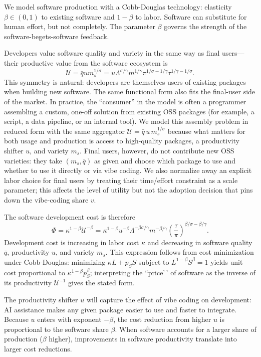 \documentclass[11pt,a4paper]{article}
\theoremstyle{definition}
\theoremstyle{remark}
\begin{document}
We model software production with a Cobb-Douglas technology: elasticity
\(\beta \in (0,1)\) to existing software and \(1-\beta\) to labor.
Software can substitute for human effort, but not completely. The parameter \(\beta\)
governs the strength of the software-begets-software feedback.

Developers value
software quality and variety in the same way as final users---their
productive value from the software ecosystem is \[
\mathcal U = \bar q u m_s^{1/\sigma} = u\Lambda^{\sigma/\gamma}m^{1/\gamma}{\pi^{1/\sigma-1/\gamma}}{\tau^{1/\gamma-1/\sigma}}.
\] This symmetry is natural: developers are themselves users of existing
packages when building new software. The same functional form also fits the final-user side of the market. In practice, the ``consumer'' in the model is often a programmer assembling a custom, one-off solution from existing OSS packages (for example, a script, a data pipeline, or an internal tool). We model this assembly problem in reduced form with the same aggregator $\mathcal U = \bar q\,u\,m_s^{1/\sigma}$ because what matters for both usage and production is access to high-quality packages, a productivity shifter $u$, and variety $m_s$. Final users, however, do not contribute new OSS varieties: they take $(m_s,\bar q)$ as given and choose which package to use and whether to use it directly or via vibe coding. We also normalize away an explicit labor choice for final users by treating their time/effort constraint as a scale parameter; this affects the level of utility but not the adoption decision that pins down the vibe-coding share $v$.

The software development cost is
therefore \[
\Phi = \kappa^{1-\beta}\mathcal U^{-\beta} = 
\kappa^{1-\beta}
u^{-\beta}\Lambda^{-\beta\sigma/\gamma}m^{-\beta/\gamma}
\left(\frac\tau{\pi}\right)^{\beta/\sigma-\beta/\gamma}.
\] Development cost is increasing in labor cost \(\kappa\) and
decreasing in software quality \(\bar q\), productivity \(u\), and
variety \(m_s\). This expression follows from cost minimization under
Cobb-Douglas: minimizing \(\kappa L + p_S S\) subject to
\(L^{1-\beta}S^\beta = 1\) yields unit cost proportional to
\(\kappa^{1-\beta}p_S^\beta\); interpreting the ``price'\,' of software
as the inverse of its productivity \(\mathcal{U}^{-1}\) gives the stated
form.

The productivity shifter \(u\) will capture the effect of vibe coding on
development: AI assistance makes any given package easier to use and
faster to integrate. Because \(u\) enters with exponent \(-\beta\), the
cost reduction from higher \(u\) is proportional to the software share
\(\beta\). When software accounts for a larger share of production
(\(\beta\) higher), improvements in software productivity translate into
larger cost reductions.
\end{document}

